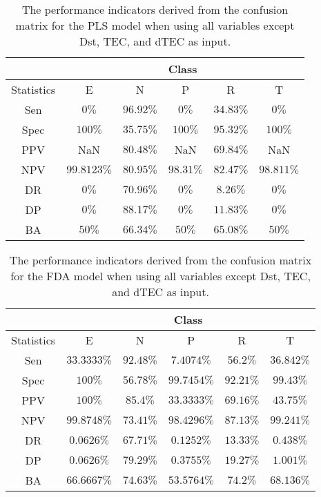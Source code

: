 \begin{table}[!ht]
	\centering
	\begin{tabular}{|c|c|c|c|c|c|}
		\hline
		 & \multicolumn{5}{c|}{Class} \\ \hline
		Statistics & E & N & P & R & T \\ \hline
		Sen & $0\%$ & $96.92\%$ & $0\%$ & $34.83\%$ & $0\%$ \\ \hline
		Spec & $100\%$ & $35.75\%$ & $100\%$ & $95.32\%$ & $100\%$ \\ \hline
		PPV & NaN & $80.48\%$ & NaN & $69.84\%$ & NaN \\ \hline
		NPV & $99.8123\%$ & $80.95\%$ & $98.31\%$ & $82.47\%$ & $98.811\%$ \\ \hline
		DR & $0\%$ & $70.96\%$ & $0\%$ & $8.26\%$ & $0\%$ \\ \hline
		DP & $0\%$ & $88.17\%$ & $0\%$ & $11.83\%$ & $0\%$ \\ \hline
		BA & $50\%$ & $66.34\%$ & $50\%$ & $65.08\%$ & $50\%$ \\ \hline
	\end{tabular}
	\caption{The performance indicators derived from the confusion matrix for the PLS model when using all variables except Dst, TEC, and dTEC as input.}
	\label{tab:cs:reverse:noTEC:pls}
\end{table}

\begin{table}[!ht]
	\centering
	\begin{tabular}{|c|c|c|c|c|c|}
		\hline
		 & \multicolumn{5}{c|}{Class} \\ \hline
		Statistics & E & N & P & R & T \\ \hline
		Sen & $33.3333\%$ & $92.48\%$ & $7.4074\%$ & $56.2\%$ & $36.842\%$ \\ \hline
		Spec & $100\%$ & $56.78\%$ & $99.7454\%$ & $92.21\%$ & $99.43\%$ \\ \hline
		PPV & $100\%$ & $85.4\%$ & $33.3333\%$ & $69.16\%$ & $43.75\%$ \\ \hline
		NPV & $99.8748\%$ & $73.41\%$ & $98.4296\%$ & $87.13\%$ & $99.241\%$ \\ \hline
		DR & $0.0626\%$ & $67.71\%$ & $0.1252\%$ & $13.33\%$ & $0.438\%$ \\ \hline
		DP & $0.0626\%$ & $79.29\%$ & $0.3755\%$ & $19.27\%$ & $1.001\%$ \\ \hline
		BA & $66.6667\%$ & $74.63\%$ & $53.5764\%$ & $74.2\%$ & $68.136\%$ \\ \hline
	\end{tabular}
	\caption{The performance indicators derived from the confusion matrix for the FDA model when using all variables except Dst, TEC, and dTEC as input.}
	\label{tab:cs:reverse:noTEC:fda}
\end{table}

